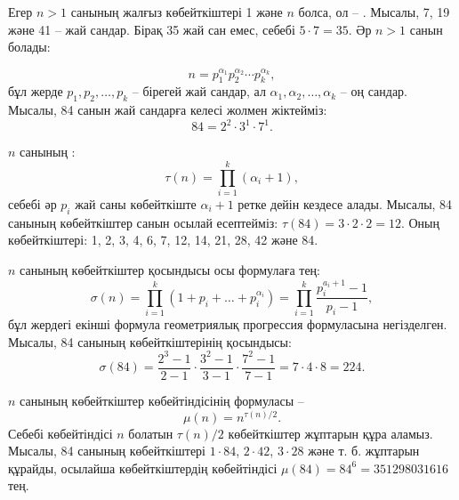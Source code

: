 
Егер $n>1$ санының жалғыз көбейткіштері 
1 және $n$ болса, ол -- .
Мысалы, 7, 19 және 41 -- жай сандар. Бірақ
35 жай сан емес, себебі $5 \cdot 7 = 35$.
Әр $n>1$ санын  болады:

\[ n = p_1^{\alpha_1} p_2^{\alpha_2} \cdots p_k^{\alpha_k},\]
бұл жерде $p_1,p_2,\ldots,p_k$ -- бірегей жай сандар, ал 
$\alpha_1,\alpha_2,\ldots,\alpha_k$ -- оң сандар.
Мысалы, 84 санын жай сандарға келесі жолмен жіктейміз:
\[84 = 2^2 \cdot 3^1 \cdot 7^1.\]

$n$ санының :
\[\tau(n)=\prod_{i=1}^k (\alpha_i+1),\]
себебі әр $p_i$ жай саны көбейткіште $\alpha_i+1$ ретке дейін
кездесе алады.
Мысалы, 84 санының көбейткіштер санын осылай есептейміз:
$\tau(84)=3 \cdot 2 \cdot 2 = 12$.
Оның көбейткіштері: 1, 2, 3, 4, 6, 7, 12, 14, 
21, 28, 42 және 84.

$n$ санының көбейткіштер қосындысы осы формулаға тең:
\[\sigma(n)=\prod_{i=1}^k (1+p_i+\ldots+p_i^{\alpha_i}) = \prod_{i=1}^k \frac{p_i^{a_i+1}-1}{p_i-1},\]
бұл жердегі екінші формула геометриялық прогрессия формуласына
негізделген.
Мысалы, 84 санының көбейткіштерінің қосындысы:
\[\sigma(84)=\frac{2^3-1}{2-1} \cdot \frac{3^2-1}{3-1} \cdot \frac{7^2-1}{7-1} = 7 \cdot 4 \cdot 8 = 224.\]

$n$ санының көбейткіштер көбейтіндісінің формуласы --
\[\mu(n)=n^{\tau(n)/2}.\]
Себебі көбейтіндісі $n$ болатын 
$\tau(n)/2$ 
көбейткіштер жұптарын құра аламыз.
Мысалы, 84 санының көбейткіштері
$1 \cdot 84$, $2 \cdot 42$, $3 \cdot 28$ және т. б.
жұптарын құрайды, осылайша көбейткіштердің
көбейтіндісі $\mu(84)=84^6=351298031616$ тең.

